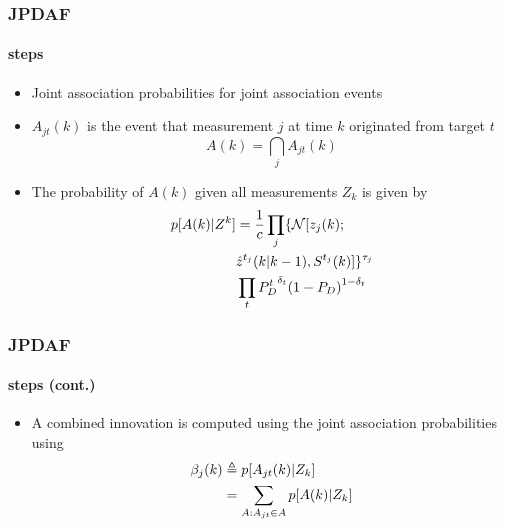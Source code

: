 



\begin{frame}
\frametitle{JPDAF}
\framesubtitle{steps}
\logoCSIPCPL\mypagenum
	\begin{itemize}%
		\item Joint association probabilities for joint association events
		\item $A_{jt}(k)$ is the event that measurement $j$ at time $k$ originated from target $t$
		\begin{equation*}
			A(k) = \bigcap_j A_{jt}(k)
		\end{equation*}
		\item The probability of $A(k)$ given all measurements $Z_k$ is given by
		\begin{align*}
			\small
			p[A(k)|Z^k] 	&= \frac{1}{c} \prod_j \{ \mathcal{N} [z_j(k); \\ 
						&\hat{z}^{t_j}(k|k-1), S^{t_j}(k)] \}^{\tau_j	}\\
						& \prod_t {P^t_D}^{\delta_t}{(1-P_D)}^{1-\delta_t}
		\end{align*}
	\end{itemize}
\end{frame}





\begin{frame}
\frametitle{JPDAF}
\framesubtitle{steps (cont.)}
\logoCSIPCPL\mypagenum
	\begin{itemize}	
		\item A combined innovation is computed using the joint association probabilities using
		\begin{align*}
			\beta_{j}(k) &\triangleq p[A_{jt}(k)|Z_k]  \notag\\
			&= \sum_{A:A_{jt} \in A} p[A(k)|Z_k]
		\end{align*}
	\end{itemize}
\end{frame}





